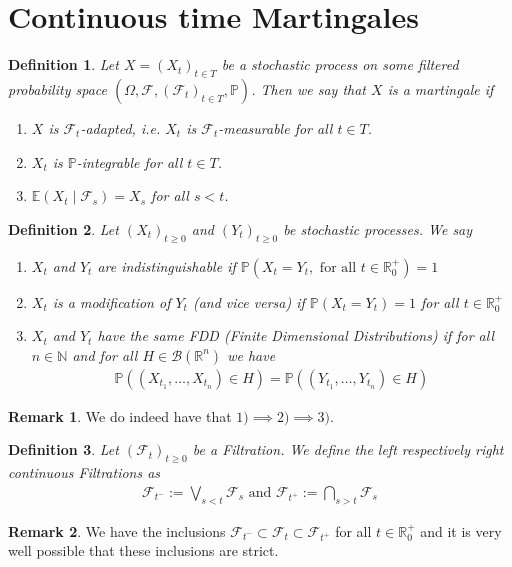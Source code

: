 \documentclass[11pt,a4paper, final]{article}
\newtheorem{defn}{Definition}[section]
\theoremstyle{definition}
\newtheorem{rem}{Remark}[section]
\begin{document}
\section{Continuous time Martingales}
\begin{defn} Let $X=(X_t)_{t \in T}$ be a stochastic process on some filtered probability space $( \Omega, \mathcal{F}, ( \mathcal{F}_t)_{t \in T}, \mathbb{P})$. Then we say that $X$ is a martingale if  
\begin{enumerate}
\item $X$ is $\mathcal{F}_t$-adapted, i.e. $X_t$ is $\mathcal{F}_t$-measurable for all $t \in T$.
\item $X_t$ is $\mathbb{P}$-integrable for all $t \in T$. 
\item $\mathbb{E}(X_t \mid \mathcal{F}_s) = X_s$ for all $s < t$.
\end{enumerate}
\end{defn}
\begin{defn} Let $(X_t)_{t \geq 0}$ and $(Y_t)_{t \geq 0}$ be stochastic processes. We say 
\begin{enumerate}
\item $X_t$ and $Y_t$ are indistinguishable if  $\mathbb{P}(X_t = Y_t, \text{ for all } t \in \mathbb{R}_0^+)=1$
\item $X_t$ is a modification of $Y_t$ (and vice versa) if $\mathbb{P}(X_t=Y_t)=1$ for all $t \in \mathbb{R}_0^+$ 
\item $X_t$ and $Y_t$ have the same FDD (Finite Dimensional Distributions) if for all $n \in \mathbb{N}$ and for all $H \in \mathcal{B}( \mathbb{R}^n)$ we have 
\begin{align*}
\mathbb{P}( (X_{t_1}, \dots , X_{t_n}) \in H ) = \mathbb{P}( (Y_{t_1}, \dots , Y_{t_n}) \in H)
\end{align*}
\end{enumerate}
\end{defn}
\begin{rem} We do indeed have that $1) \implies 2) \implies 3)$. 
\end{rem}
\begin{defn} Let $(\mathcal{F}_t)_{t \geq 0}$ be a Filtration. We define the left respectively right continuous Filtrations as 
\begin{align*}
\mathcal{F}_{t^-}:= \bigvee_{s <t} \mathcal{F}_s \text{ and } \mathcal{F}_{t^+} := \bigcap_{s >t} \mathcal{F}_s
\end{align*}
\end{defn}
\begin{rem} We have the inclusions $\mathcal{F}_{t^-} \subset \mathcal{F}_t \subset \mathcal{F}_{t^+}$ for all $t \in \mathbb{R}_0^+$ and it is very well possible that these inclusions are strict. 
\end{rem}
\end{document}
